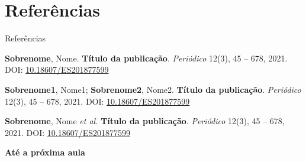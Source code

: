 \documentclass[aspectratio=169,xcolor=dvipsnames]{beamer}
\begin{document}
\section{Referências}
\begin{frame}{Referências}
    
    \footnotesize{
        \thispagestyle{empty}
        \clearpage
        \begin{thebibliography}{5}
             \textbf{Sobrenome}, Nome.
            \newblock \textbf{Título da publicação}.
            \newblock \emph{Periódico} 12(3), 45 -- 678, 2021.
            \newblock DOI: \href{https://dx.doi.org/10.18607/ES201877599}{10.18607/ES201877599}

             \textbf{Sobrenome1}, Nome1; \textbf{Sobrenome2}, Nome2.
            \newblock \textbf{Título da publicação}.
            \newblock \emph{Periódico} 12(3), 45 -- 678, 2021.
            \newblock DOI: \href{https://dx.doi.org/10.18607/ES201877599}{10.18607/ES201877599}

             \textbf{Sobrenome}, Nome \textit{et al.}
            \newblock \textbf{Título da publicação}.
            \newblock \emph{Periódico} 12(3), 45 -- 678, 2021.
            \newblock DOI: \href{https://dx.doi.org/10.18607/ES201877599}{10.18607/ES201877599}

        \end{thebibliography}
    }
\end{frame}

\begin{frame}
    \Huge{\centerline{\textbf{Até a próxima aula}}}
\end{frame}
\end{document}
